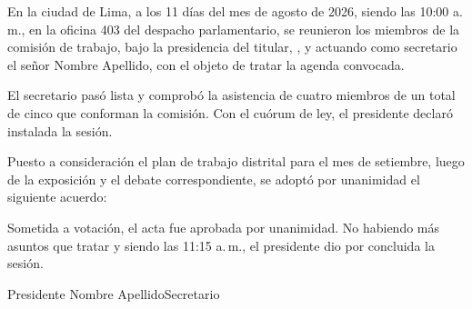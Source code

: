 \documentclass{acta}
\begin{document}
\numerodocumento
{}

En la ciudad de Lima, a los 11 días del mes de agosto de 2026, siendo
las 10:00 a.\,m., en la oficina 403 del despacho parlamentario, se
reunieron los miembros de la comisión de trabajo, bajo la presidencia
del titular, , y actuando como secretario el
señor Nombre Apellido, con el objeto de tratar la agenda convocada.


El secretario pasó lista y comprobó la asistencia de cuatro miembros de
un total de cinco que conforman la comisión. Con el cuórum de ley, el
presidente declaró instalada la sesión.


Puesto a consideración el plan de trabajo distrital para el mes de
setiembre, luego de la exposición y el debate correspondiente, se adoptó
por unanimidad el siguiente acuerdo:



Sometida a votación, el acta fue aprobada por unanimidad. No habiendo más
asuntos que tratar y siendo las 11:15 a.\,m., el presidente dio por
concluida la sesión.

\firmasacta
  {}{Presidente}
  {Nombre Apellido}{Secretario}
\end{document}
